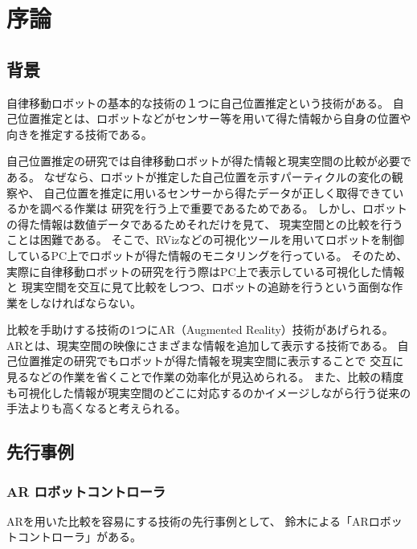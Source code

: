 \chapter{序論}

\section{背景}
自律移動ロボットの基本的な技術の１つに自己位置推定という技術がある。
自己位置推定とは、ロボットなどがセンサー等を用いて得た情報から自身の位置や向きを推定する技術である。

自己位置推定の研究では自律移動ロボットが得た情報と現実空間の比較が必要である。
なぜなら、ロボットが推定した自己位置を示すパーティクルの変化の観察や、
自己位置を推定に用いるセンサーから得たデータが正しく取得できているかを調べる作業は
研究を行う上で重要であるためである。
しかし、ロボットの得た情報は数値データであるためそれだけを見て、
現実空間との比較を行うことは困難である。
そこで、RVizなどの可視化ツールを用いてロボットを制御しているPC上でロボットが得た情報のモニタリングを行っている。
そのため、実際に自律移動ロボットの研究を行う際はPC上で表示している可視化した情報と
現実空間を交互に見て比較をしつつ、ロボットの追跡を行うという面倒な作業をしなければならない。

比較を手助けする技術の1つにAR（Augmented Reality）技術があげられる。
ARとは、現実空間の映像にさまざまな情報を追加して表示する技術である。
自己位置推定の研究でもロボットが得た情報を現実空間に表示することで
交互に見るなどの作業を省くことで作業の効率化が見込められる。
また、比較の精度も可視化した情報が現実空間のどこに対応するのかイメージしながら行う従来の手法よりも高くなると考えられる。

\section{先行事例}

\subsection{AR ロボットコントローラ}
ARを用いた比較を容易にする技術の先行事例として、
鈴木による「ARロボットコントローラ」\cite{鈴木勇矢2019ARロボットコントローラ}がある。


